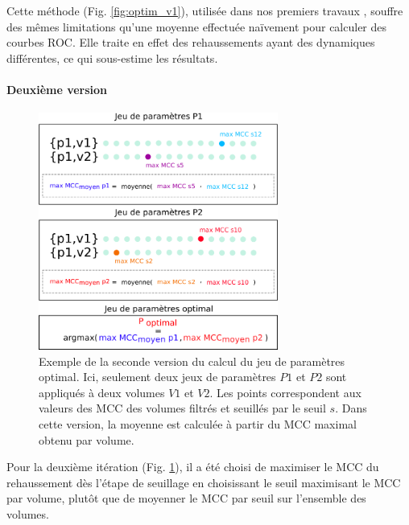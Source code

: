   Cette méthode (Fig. \ref{fig:optim_v1}), utilisée dans nos premiers travaux \cite{Lamy2020_VPH_bench} \cite{Lamy2021_RRPR} \cite{Lamy2020_ICPR} \cite{Lamy2021_ORASIS}, souffre des mêmes limitations qu'une moyenne effectuée naïvement pour calculer des courbes ROC. Elle traite en effet des rehaussements ayant des dynamiques différentes, ce qui sous-estime les résultats. 
  
  \paragraph{Deuxième version}

  \begin{figure}[!ht]
    \centering
    \includegraphics[width=0.70\textwidth]{Images/optim_v2.png}
    \caption{Exemple de la seconde version du calcul du jeu de paramètres optimal. Ici, seulement deux jeux de paramètres $P1$ et $P2$ sont appliqués à deux volumes $V1$ et $V2$. Les points correspondent aux valeurs des MCC des volumes filtrés et seuillés par le seuil $s$. Dans cette version, la moyenne est calculée à partir du MCC maximal obtenu par volume.}
    \label{fig:optim_v2}
  \end{figure}

  Pour la deuxième itération (Fig. \ref{fig:optim_v2}), il a été choisi de maximiser le MCC du rehaussement dès l'étape de seuillage en choisissant le seuil maximisant le MCC par volume, plutôt que de moyenner le MCC par seuil sur l'ensemble des volumes. 

